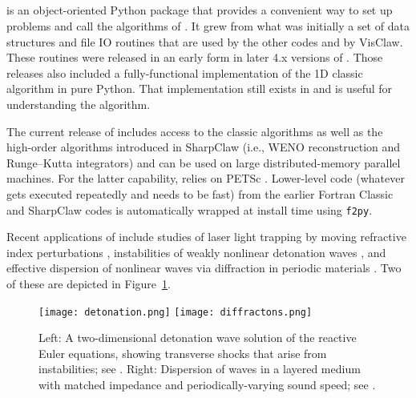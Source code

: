 %
%
%

\subsection{\pyclaw} \label{sec:pyclaw}
\pyclaw is an object-oriented Python package that provides a convenient way
to set up problems and call the algorithms of \clawpack.  It grew
from what was initially a set of data structures and file IO routines that are
used by the other \clawpack codes and by VisClaw.  These routines were released in
an early form in later 4.x versions of \clawpack.  Those releases also
included a fully-functional implementation of the 1D classic algorithm
in pure Python. That implementation still exists in \pyclaw and is useful
for understanding the algorithm.

The current release of \pyclaw includes access to the classic algorithms as well
as the high-order algorithms introduced in SharpClaw \cite{2013_sharpclaw} (i.e., WENO
reconstruction and Runge--Kutta integrators) and can be used on large
distributed-memory parallel machines.  For the latter capability, \pyclaw
relies on PETSc \cite{petsc-user-ref}.
Lower-level code (whatever gets executed
repeatedly and needs to be fast) from the earlier Fortran Classic and SharpClaw
codes is automatically wrapped at install time using \texttt{f2py}.

Recent applications of \pyclaw include studies of laser light trapping by moving
refractive index perturbations \cite{sanroman_thesis}, instabilities of weakly nonlinear detonation
waves \cite{faria2015qualitative}, and effective dispersion of nonlinear waves via diffraction in
periodic materials \cite{2015_diffractons}.  Two of these are depicted in
Figure~\ref{fig:pyclaw-apps}.

\begin{figure}
\hfil\texttt{[image: detonation.png]}
\hskip 5pt
\hfil\texttt{[image: diffractons.png]}
\hskip 5pt
\caption{\label{fig:pyclaw-apps}
Left: A two-dimensional detonation wave solution of the reactive Euler equations,
showing transverse shocks that arise from instabilities; see \cite{faria2015qualitative}.
Right: Dispersion of waves in a layered medium with matched impedance and periodically-varying
sound speed; see \cite{2015_diffractons}.}
\end{figure}


